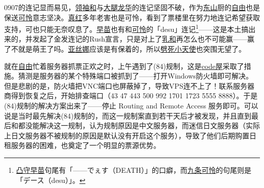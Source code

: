 
0907的连记显而易见，\uline{领袖和}与\uline{大腿龙华}的连记坚固不破，作为\uline{东山}厨的\uline{自由}也是保送\uline{可怜}意志坚决。\uline{真红}多年老害也是可怜，看到了票楼里在努力地连记希望获取支持，可也只能无奈叹息了。\uline{早苗}也有和\uline{可怜}的「desu」连记\footnote{\uline{凸守早苗}句尾有「——でぇす（DEATH）」的口癖，而\uline{九条可怜}的句尾则是「デース（desu）」。}——这是本土搞出来的，并发起了金发连记的Rush宣言，只是对上了\uline{乳和}再怎么也不可能赢——赢了不就是萌王了吗。\uline{亚丝娜}应该是有保着的，所以\uline{劈死小天使}也突围无望了。

就在\uline{自由}忙着服务器抓票正欢之时，上午遇到了(84)规制，这是\uline{code屋}采取了措施。猜测是服务器的某个特殊端口被抓到了——打开Windows防火墙即可解决。但是悲剧的是，防火墙把VNC端口也屏蔽掉了，导致VPS连不上了！联系服务器商得到恢复之后，开始排查端口（43 47 443 500 992 1701 1723 5555 8888）。于是(84)规制的解决方案出来了——停止 Routing and Remote Access 服务即可。可以说是当时最先解决(84)规制的，而这一规制案直到若干天后才被发现，并且直到最后和都没能解决这一规制，认为规制原因是中文服务器，而迷信日文服务器（实际上日文服务器不被规制的原因是默认没有开启这个服务），导致了他们后期购置日租服务器的困难，也奠定了一个明显的票源优势。

